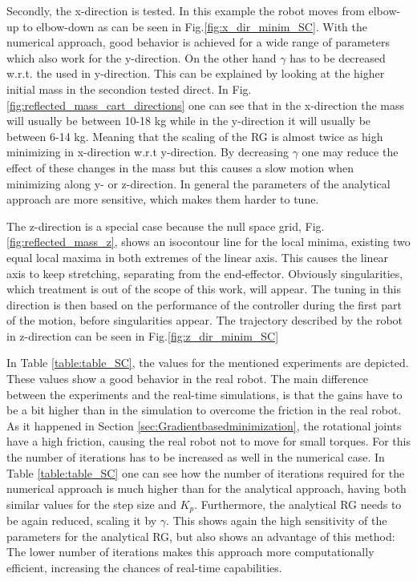 %
%
Secondly, the x-direction is tested. In this example the robot moves from elbow-up to elbow-down as can be seen in Fig.\ref{fig:x_dir_minim_SC}.  With the numerical approach, good behavior is achieved for a wide range of parameters which also work for the y-direction. On the other hand $\gamma$ has to be decreased w.r.t. the used in y-direction. This can be explained by looking at the higher initial mass in the secondion tested direct. In Fig.\ref{fig:reflected_mass_cart_directions}  one can see that in the x-direction the mass will usually be between 10-18 kg while in the y-direction it will usually be between 6-14 kg. Meaning that the scaling of the RG is almost twice as high minimizing in x-direction w.r.t y-direction.  By decreasing $\gamma$ one may reduce the effect of these changes in the mass but this causes a slow motion when minimizing along y- or z-direction.
In general the parameters of the analytical approach are more sensitive, which makes them harder to tune.

The z-direction is a special case because the null space grid, Fig.\ref{fig:reflected_mass_z}, shows an isocontour line for the local minima, existing two equal local maxima in both extremes of the linear axis. This causes the linear axis to keep stretching,  separating from the end-effector. Obviously singularities, which treatment is out of the scope of this work, will appear. The tuning in this direction is then based on the performance of the controller during the first part of the motion, before singularities appear. %
The trajectory described by the robot in z-direction can be seen in Fig.\ref{fig:z_dir_minim_SC}




In Table \ref{table:table_SC}, the values for the mentioned experiments are depicted. These values show a good behavior in the real robot. The main difference between the experiments and the real-time simulations, is that the gains have to be a bit higher than in the simulation to overcome the friction in the real robot. As it happened in Section \ref{sec:Gradientbasedminimization}, the rotational joints have a high friction, causing the real robot not to move for small torques. For this the number of iterations has to be increased as well in the numerical case. In Table \ref{table:table_SC} one can see how the number of iterations required for the numerical approach is much higher than for the analytical approach, having both similar values for the step size and $K_p$. Furthermore, the analytical RG needs to be again  reduced, scaling it by $\gamma$. This shows again the high sensitivity of the parameters for the analytical RG, but also shows an advantage of this method: The lower number of iterations makes this approach more computationally efficient, increasing the chances of real-time capabilities.


